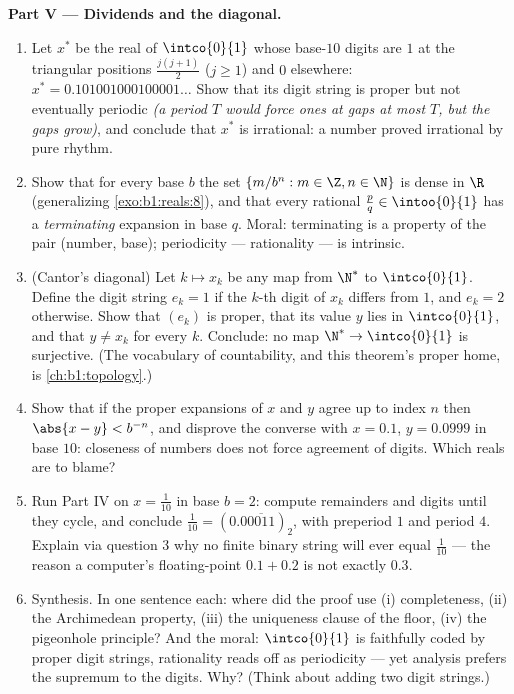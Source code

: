 \begin{problem}
\medskip
\noindent\textbf{Part V --- Dividends and the diagonal.}
\begin{enumerate}[resume]
  \item Let $x^*$ be the real of $\intco{0}{1}$ whose base-$10$
        digits are $1$ at the triangular positions $\frac{j(j +
        1)}{2}$ ($j \geq 1$) and $0$ elsewhere: $x^* =
        0.101001000100001\dots$ Show that its digit string is
        proper but not eventually periodic \emph{(a period $T$
        would force ones at gaps at most $T$, but the gaps grow)},
        and conclude that $x^*$ is irrational: a number proved
        irrational by pure rhythm.
  \item Show that for every base $b$ the set $\{m/b^n : m \in \Z,
        n \in \N\}$ is dense in $\R$ (generalizing
        \cref{exo:b1:reals:8}), and that every rational $\frac pq
        \in \intoo{0}{1}$ has a \emph{terminating} expansion in
        base $q$. Moral: terminating is a property of the pair
        (number, base); periodicity --- rationality --- is
        intrinsic.
  \item (Cantor's diagonal) Let $k \mapsto x_k$ be any map from
        $\N^*$ to $\intco{0}{1}$. Define the digit string $e_k =
        1$ if the $k$-th digit of $x_k$ differs from $1$, and
        $e_k = 2$ otherwise. Show that $(e_k)$ is proper, that
        its value $y$ lies in $\intco{0}{1}$, and that $y \neq
        x_k$ for every $k$. Conclude: no map $\N^* \to
        \intco{0}{1}$ is surjective. (The vocabulary of
        countability, and this theorem's proper home, is
        \cref{ch:b1:topology}.)
  \item Show that if the proper expansions of $x$ and $y$ agree
        up to index $n$ then $\abs{x - y} < b^{-n}$, and disprove
        the converse with $x = 0.1$, $y = 0.0999$ in base $10$:
        closeness of numbers does not force agreement of digits.
        Which reals are to blame?
  \item Run Part IV on $x = \frac{1}{10}$ in base $b = 2$:
        compute remainders and digits until they cycle, and
        conclude $\frac{1}{10} = (0.0\overline{0011})_2$, with
        preperiod $1$ and period $4$. Explain via question 3 why
        no finite binary string will ever equal $\frac{1}{10}$
        --- the reason a computer's floating-point $0.1 + 0.2$ is
        not exactly $0.3$.
  \item Synthesis. In one sentence each: where did the proof use
        (i) completeness, (ii) the Archimedean property, (iii)
        the uniqueness clause of the floor, (iv) the pigeonhole
        principle? And the moral: $\intco{0}{1}$ is faithfully
        coded by proper digit strings, rationality reads off as
        periodicity --- yet analysis prefers the supremum to the
        digits. Why? (Think about adding two digit strings.)
\end{enumerate}
\end{problem}
